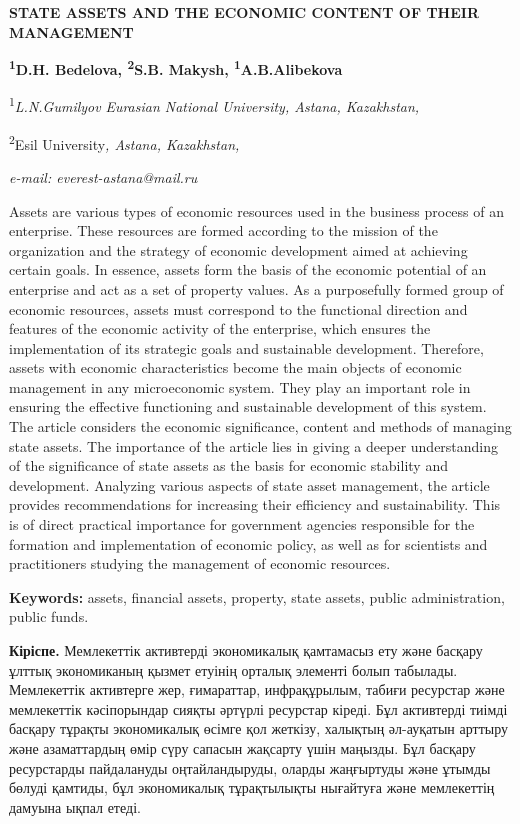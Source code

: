 {{\bfseries STATE ASSETS AND THE ECONOMIC CONTENT OF THEIR MANAGEMENT}

{\bfseries \textsuperscript{1}D.H. Bedelova\textsuperscript{\envelope },
\textsuperscript{2}S.B. Makysh, \textsuperscript{1}A.B.Alibekova}

\textsuperscript{1}\emph{L.N.Gumilyov} \emph{Eurasian National
University, Astana, Kazakhstan,}

\textsuperscript{2}Esil University\emph{, Astana, Kazakhstan,}

\emph{e-mail: everest-astana@mail.ru}

Assets are various types of economic resources used in the business
process of an enterprise. These resources are formed according to the
mission of the organization and the strategy of economic development
aimed at achieving certain goals. In essence, assets form the basis of
the economic potential of an enterprise and act as a set of property
values. As a purposefully formed group of economic resources, assets
must correspond to the functional direction and features of the economic
activity of the enterprise, which ensures the implementation of its
strategic goals and sustainable development. Therefore, assets with
economic characteristics become the main objects of economic management
in any microeconomic system. They play an important role in ensuring the
effective functioning and sustainable development of this system. The
article considers the economic significance, content and methods of
managing state assets. The importance of the article lies in giving a
deeper understanding of the significance of state assets as the basis
for economic stability and development. Analyzing various aspects of
state asset management, the article provides recommendations for
increasing their efficiency and sustainability. This is of direct
practical importance for government agencies responsible for the
formation and implementation of economic policy, as well as for
scientists and practitioners studying the management of economic
resources.

{\bfseries Keywords:} assets, financial assets, property, state assets,
public administration, public funds.

{\bfseries Кіріспе.} Мемлекеттік активтерді экономикалық қамтамасыз ету
және басқару ұлттық экономиканың қызмет етуінің орталық элементі болып
табылады. Мемлекеттік активтерге жер, ғимараттар, инфрақұрылым, табиғи
ресурстар және мемлекеттік кәсіпорындар сияқты әртүрлі ресурстар кіреді.
Бұл активтерді тиімді басқару тұрақты экономикалық өсімге қол жеткізу,
халықтың әл-ауқатын арттыру және азаматтардың өмір сүру сапасын жақсарту
үшін маңызды. Бұл басқару ресурстарды пайдалануды оңтайландыруды, оларды
жаңғыртуды және ұтымды бөлуді қамтиды, бұл экономикалық тұрақтылықты
нығайтуға және мемлекеттің дамуына ықпал етеді.

}
